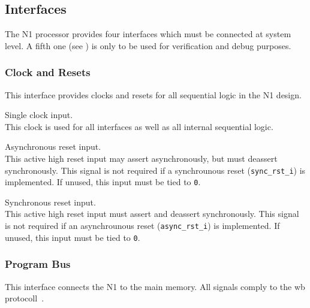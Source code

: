 \subsection{Interfaces}
\label{integration:if}

The N1 processor provides four interfaces which must be connected at system level.
A fifth one (see ) is only to be used for verification and debug purposes.

\subsubsection{Clock and Resets}
\label{integration:if:clk}
This interface provides clocks and resets for all sequential logic in the N1 design.

\begin{description}[style=nextline]

\item[\texttt{clk\_i}] Single clock input. \\  
  This clock is used for all interfaces as well as all internal sequential logic.

\item[\texttt{async\_rst\_i}] Asynchronous reset input. \\
  This active high reset input may assert asynchronously, but must deassert synchronously.
  This signal is not required if a synchrounous reset (\texttt{sync\_rst\_i}) is implemented.
  If unused, this input must be tied to \texttt{0}.

\item[\texttt{sync\_rst\_i}] Synchronous reset input. \\
  This active high reset input must assert and deassert synchronously.
  This signal is not required if an asynchrounous reset (\texttt{async\_rst\_i}) is implemented.
  If unused, this input must be tied to \texttt{0}.
 
\end{description}

\subsubsection{Program Bus}
\label{integration:if:pbus}
This interface connects the N1 to the main memory.
All signals comply to the \gls{wb} protocoll~\cite{wishbone}.

